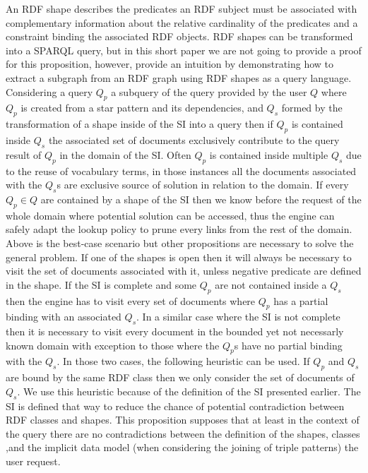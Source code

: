 An RDF shape describes the predicates an RDF subject must be associated with complementary information about
the relative cardinality of the predicates and a constraint binding the associated RDF objects.
RDF shapes can be transformed into a SPARQL query, but
in this short paper we are not going to provide a proof for this proposition, however,
\citeauthor{Delva2021} provide an intuition by demonstrating how to extract 
a subgraph from an RDF graph using RDF shapes as a query language.
Considering a query $Q_p$ a subquery of the query provided by the user $Q$
where $Q_p$ is created from a star pattern and its dependencies, and $Q_s$ formed by the transformation of a shape inside of the SI
into a query then if  $Q_p$ is contained inside $Q_s$ the associated 
set of documents exclusively contribute to the query result of $Q_p$ in the domain of the SI.
Often $Q_p$ is contained inside multiple $Q_s$ due to the reuse of vocabulary terms,
in those instances all the documents associated with the $Q_s$s are exclusive source of solution in relation to the domain.
If every $Q_p \in Q$ are contained by a shape of the SI then we know before the request of the whole domain
where potential solution can be accessed, thus the engine can safely adapt the lookup policy to prune every links from the rest of the domain.
Above is the best-case scenario but other propositions are necessary to solve the general problem.
If one of the shapes is open then it will always be necessary to visit the set of documents associated
with it, unless negative predicate are defined in the shape.
If the SI is complete and some $Q_p$ are not contained inside a $Q_s$ then the engine has to visit
every set of documents where $Q_p$ has a partial binding with an associated $Q_s$.
In a similar case where the SI is not complete then it is necessary to visit every document in the bounded yet not necessarly known domain 
with exception to those where the $Q_p$s have no partial binding with the $Q_s$.
In those two cases, the following heuristic can be used.
If $Q_p$ and $Q_s$ are bound by the same RDF class then we only consider the set of documents of $Q_s$.
We use this heuristic because of the definition of the SI presented earlier.
The SI is defined that way to reduce the chance of potential contradiction between RDF classes and shapes.
This proposition supposes that at least in the context of the query there are no contradictions between the
definition of the shapes, classes ,and the implicit data model (when considering the joining of triple patterns) the user request.